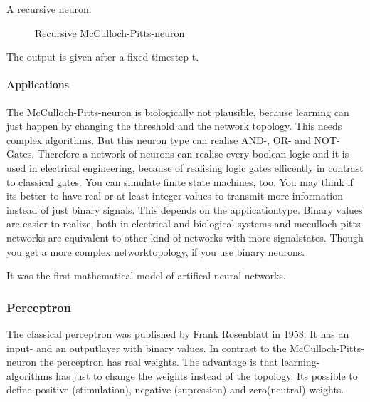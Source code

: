 \documentclass[10pt,a4paper,DIV=11]{scrreprt}
\begin{document}
A recursive neuron:

\begin{figure}[H]
	\centering
	\caption{Recursive McCulloch-Pitts-neuron}
	\label{fig:pitts3}
\end{figure}

The output is given after a fixed timestep t.

\paragraph{Applications}
The McCulloch-Pitts-neuron is biologically not plausible, because learning
can just happen by changing the threshold and the network topology. This
needs complex algorithms.
But this neuron type can realise AND-, OR- and NOT-Gates.
Therefore a network of neurons can realise every boolean logic and it is used in electrical engineering, because of realising logic gates efficently in contrast to classical gates. You can simulate finite state machines, too.
You may think if its better to have real or at least integer values to transmit more information instead of just binary signals. This depends on the applicationtype. Binary values are easier to realize, both in electrical and biological systems and mcculloch-pitts-networks are equivalent to other kind of networks with more signalstates. Though you get a more complex networktopology, if you use binary neurons.

It was the first mathematical model of artifical neural networks.\cite{NEURONMATH}


\subsubsection{Perceptron}
The classical perceptron was published by Frank Rosenblatt in 1958.
It has an input- and an outputlayer with binary values. In contrast to the McCulloch-Pitts-neuron
the perceptron has real weights. The advantage is that learning-algorithms has just to change the weights
instead of the topology. Its possible to define positive (stimulation), negative (supression) and zero(neutral) weights.
\end{document}
